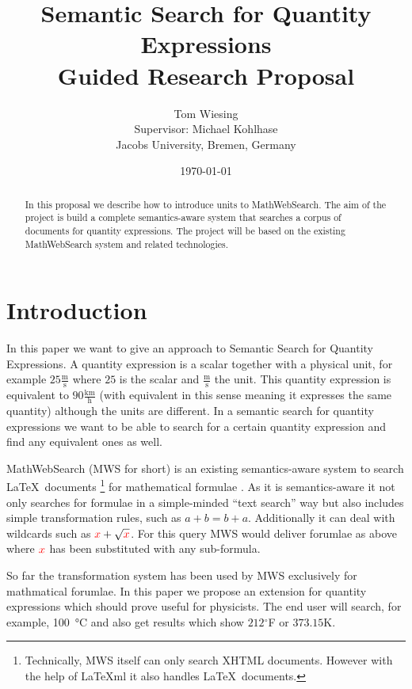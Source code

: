 \documentclass[11pt]{article}
\title{Semantic Search for Quantity Expressions\\ \vspace{2 mm} Guided Research Proposal}
\author{Tom Wiesing\\Supervisor: Michael Kohlhase\\Jacobs University, Bremen, Germany}
\date{\today}
\begin{document}
\maketitle
{}

\begin{abstract}
  In this proposal we describe how to introduce units to MathWebSearch. The aim of the project is build a complete semantics-aware system that searches a corpus of documents for quantity expressions. The project will be based on the existing MathWebSearch system and related technologies.
\end{abstract}

\tableofcontents

\section{Introduction}

In this paper we want to give an approach to Semantic Search for Quantity Expressions. A quantity expression is a scalar together with a physical unit, for example $25 \frac{\text{m}}{\text{s}}$ where $25$ is the scalar and $\frac{\text{m}}{\text{s}}$ the unit. This quantity expression is equivalent to $90 \frac{\text{km}}{\text{h}}$ (with equivalent in this sense meaning it expresses the same quantity) although the units are different. In a semantic search for quantity expressions we want to be able to search for a certain quantity expression and find any equivalent ones as well.

MathWebSearch (MWS for short) is an existing semantics-aware system to search \LaTeX \  documents \footnote{Technically, MWS itself can only search XHTML documents. However with the help of \LaTeX{}ml \cite{Miller:latexml:base} it also handles \LaTeX \ documents. } for mathematical formulae \cite{HamKohPro:man14}. As it is semantics-aware it not only searches for formulae in a simple-minded ``text search'' way but also includes simple transformation rules, such as $a + b = b + a$. Additionally it can deal with wildcards such as $ { \color{red} x} + \sqrt{\color{red} x}$. For this query MWS would deliver forumlae as above where $ { \color{red} x} $ has been substituted with any sub-formula.

So far the transformation system has been used by MWS exclusively for mathmatical forumlae. In this paper we propose an extension for quantity expressions which should prove useful for physicists.
The end user will search, for example, \SI{100}{\degreeCelsius} and also get results which show $212$$^\circ$F or $373.15$K.
\end{document}
